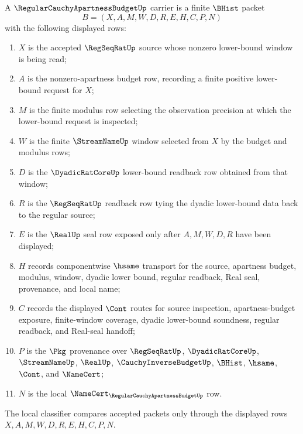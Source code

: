 \begin{definition}
\label{def:regular-cauchy-apartness-budget-carrier}
A $\RegularCauchyApartnessBudgetUp$ carrier is a finite $\BHist$ packet
$$
B=(X,A,M,W,D,R,E,H,C,P,N)
$$
with the following displayed rows:
\begin{enumerate}
\item $X$ is the accepted $\RegSeqRatUp$ source whose nonzero lower-bound window is being read;
\item $A$ is the nonzero-apartness budget row, recording a finite positive lower-bound request for $X$;
\item $M$ is the finite modulus row selecting the observation precision at which the lower-bound request is inspected;
\item $W$ is the finite $\StreamNameUp$ window selected from $X$ by the budget and modulus rows;
\item $D$ is the $\DyadicRatCoreUp$ lower-bound readback row obtained from that window;
\item $R$ is the $\RegSeqRatUp$ readback row tying the dyadic lower-bound data back to the regular source;
\item $E$ is the $\RealUp$ seal row exposed only after $A,M,W,D,R$ have been displayed;
\item $H$ records componentwise $\hsame$ transport for the source, apartness budget, modulus, window, dyadic lower bound, regular readback, Real seal, provenance, and local name;
\item $C$ records the displayed $\Cont$ routes for source inspection, apartness-budget exposure, finite-window coverage, dyadic lower-bound soundness, regular readback, and Real-seal handoff;
\item $P$ is the $\Pkg$ provenance over $\RegSeqRatUp$, $\DyadicRatCoreUp$, $\StreamNameUp$, $\RealUp$, $\CauchyInverseBudgetUp$, $\BHist$, $\hsame$, $\Cont$, and $\NameCert$;
\item $N$ is the local $\NameCert_{\RegularCauchyApartnessBudgetUp}$ row.
\end{enumerate}
The local classifier compares accepted packets only through the displayed rows $X,A,M,W,D,R,E,H,C,P,N$.
\end{definition}

